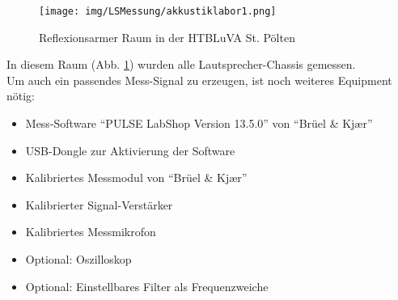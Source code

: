 \newpage
\begin{figure} [H]
	\centering
	\texttt{[image: img/LSMessung/akkustiklabor1.png]}
	\caption{Reflexionsarmer Raum in der HTBLuVA St. Pölten}
	\label{fig:4.1.1}
\end{figure}
In diesem Raum (Abb. \ref{fig:4.1.1}) wurden alle Lautsprecher-Chassis gemessen.\\
Um auch ein passendes Mess-Signal zu erzeugen, ist noch weiteres Equipment nötig:
\begin{itemize}
	\item Mess-Software \enquote{PULSE LabShop Version 13.5.0} von \enquote{Brüel \& Kj\ae r}
	\item USB-Dongle zur Aktivierung der Software
	\item Kalibriertes Messmodul von \enquote{Brüel \& Kj\ae r}
	\item Kalibrierter Signal-Verstärker
	\item Kalibriertes Messmikrofon
	\item Optional: Oszilloskop
	\item Optional: Einstellbares Filter als Frequenzweiche
\end{itemize}

\newpage
